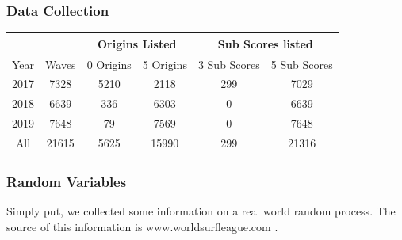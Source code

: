\documentclass{article}
\theoremstyle{definition}
\begin{document}
\subsubsection{Data Collection}
\begin{center}
\begin{tabular}{|c|c|c|c|c|c| }
\multicolumn{2}{c}{} & \multicolumn{2}{c}{Origins Listed} & \multicolumn{2}{c}{Sub Scores listed} \\
\hline
Year & Waves & 0 Origins & 5 Origins & 3 Sub Scores & 5 Sub Scores \\ 
\hline
2017 & 7328 & 5210 & 2118  & 299 & 7029  \\
2018 & 6639 & 336 & 6303  & 0 & 6639  \\
2019 & 7648 & 79 & 7569  & 0 & 7648 \\
\hline
All & 21615 & 5625 & 15990 & 299 & 21316 \\
\hline
\end{tabular}
\end{center}

\subsubsection{Random Variables}
Simply put, we collected some information on a real world random process. The source of this information is www.worldsurfleague.com .
\end{document}
